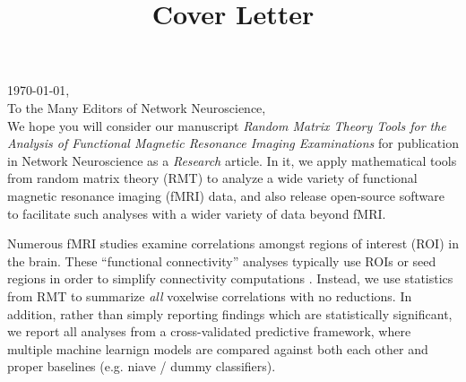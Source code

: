 \documentclass{article}
\begin{document}

\thispagestyle{fancy}
\setlength{\headheight}{30.0pt}
\normalsize

\title{Cover Letter}





\noindent
\today, \\
To the Many Editors of Network Neuroscience, \\

We hope you will consider our manuscript \emph{Random Matrix Theory Tools for the Analysis of
Functional Magnetic Resonance Imaging Examinations} for publication in Network Neuroscience as a
\emph{Research} article. In it, we apply mathematical tools from random matrix theory (RMT) to
analyze a wide variety of functional magnetic resonance imaging (fMRI) data, and also release
open-source software to facilitate such analyses with a wider variety of data beyond fMRI.

Numerous fMRI studies examine correlations amongst regions of interest (ROI) in the brain. These
``functional connectivity'' analyses typically use ROIs or seed regions in order to simplify
connectivity computations \citep{huettelFunctionalMagneticResonance2004}. Instead, we use
statistics from RMT to summarize \emph{all} voxelwise correlations with no reductions. In
addition, rather than simply reporting findings which are statistically significant, we report all
analyses from a cross-validated predictive framework, where multiple machine learnign models are
compared against both each other and proper baselines (e.g. niave / dummy classifiers).
\end{document}
